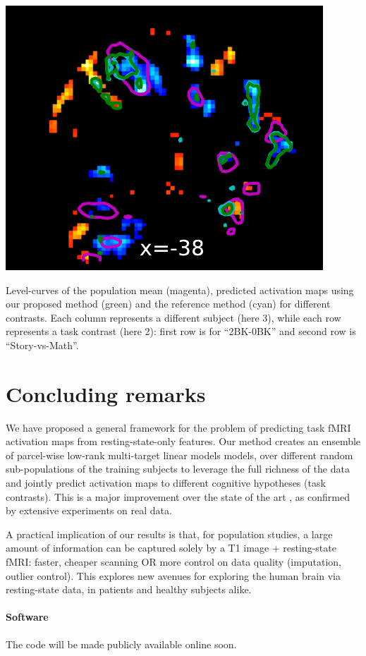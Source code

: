 \begin{pagefigure}
  \hspace{-.2cm}
  \includegraphics[width=.33\linewidth]{figures/brain_STORY-MATH_137633_01bags.pdf}
  \caption{Level-curves of the population mean (magenta), predicted activation
    maps using our proposed method (green) and the reference method \citep{tavor2016task}
    (cyan) for different contrasts. Each column represents a different subject (here 3),
    while each row represents a task contrast (here 2): first row is for ``2BK-0BK'' and second row is ``Story-vs-Math''.}
  \label{fig:zmaps}
\end{pagefigure}
  
\section{Concluding remarks}
We have proposed a general framework for the problem of predicting task fMRI activation maps
from resting-state-only features. Our method creates an ensemble of parcel-wise low-rank multi-target
linear models models, over different random sub-populations of the training subjects to leverage
the full richness of the data and jointly predict activation maps to different cognitive hypotheses
(task contrasts). This is a major improvement over the state of the art \citep{tavor2016task},
as confirmed by extensive experiments on real data. 

A practical implication of our results is that, for population
studies, a large amount of information can be captured solely by a T1
image + resting-state fMRI: faster, cheaper scanning OR more control on data quality
(imputation, outlier control). This explores new avenues for exploring
the human brain via resting-state data, in patients and healthy subjects alike.
\paragraph{Software} The code will be made publicly available online soon.

